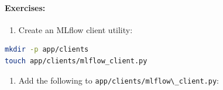 \documentclass[
  screen,review,acmlarge]{acmart}
\newcommand{\passthrough}[1]{#1}
\providecommand{\tightlist}{%
  \setlength{\itemsep}{0pt}\setlength{\parskip}{0pt}}
\begin{document}
\paragraph{Exercises:}\label{exercises-10}

\begin{enumerate}
\def\labelenumi{\arabic{enumi}.}
\tightlist
\item
  Create an MLflow client utility:
\end{enumerate}

\begin{lstlisting}[language=bash]
mkdir -p app/clients
touch app/clients/mlflow_client.py
\end{lstlisting}

\begin{enumerate}
\def\labelenumi{\arabic{enumi}.}
\setcounter{enumi}{1}
\tightlist
\item
  Add the following to \passthrough{\lstinline!app/clients/mlflow\_client.py!}:
\end{enumerate}
\end{document}
